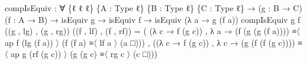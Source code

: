 \documentclass[
  11pt,
  oneside,
  article]{memoir}
\newenvironment{Shaded}{}{}
\newcommand{\NormalTok}[1]{#1}
\newcommand{\OtherTok}[1]{\textcolor[rgb]{0.00,0.44,0.13}{#1}}
\theoremstyle{definition}
\theoremstyle{plain}
\newcommand{\0}{\textsf{0}}
\newcommand{\1}{\tn{\textsf{1}}}
\begin{document}
\begin{Shaded}
\begin{Highlighting}[]
\NormalTok{compIsEquiv }\OtherTok{:} \OtherTok{∀} \OtherTok{\{}\NormalTok{ℓ ℓ\textquotesingle{} ℓ\textquotesingle{}\textquotesingle{}}\OtherTok{\}} \OtherTok{\{}\NormalTok{A }\OtherTok{:}\NormalTok{ Type ℓ}\OtherTok{\}} \OtherTok{\{}\NormalTok{B }\OtherTok{:}\NormalTok{ Type ℓ\textquotesingle{}}\OtherTok{\}} \OtherTok{\{}\NormalTok{C }\OtherTok{:}\NormalTok{ Type ℓ\textquotesingle{}\textquotesingle{}}\OtherTok{\}}
              \OtherTok{→} \OtherTok{(}\NormalTok{g }\OtherTok{:}\NormalTok{ B }\OtherTok{→}\NormalTok{ C}\OtherTok{)} \OtherTok{(}\NormalTok{f }\OtherTok{:}\NormalTok{ A }\OtherTok{→}\NormalTok{ B}\OtherTok{)} \OtherTok{→}\NormalTok{ isEquiv g }\OtherTok{→}\NormalTok{ isEquiv f}
              \OtherTok{→}\NormalTok{ isEquiv }\OtherTok{(λ}\NormalTok{ a }\OtherTok{→}\NormalTok{ g }\OtherTok{(}\NormalTok{f a}\OtherTok{))}
\NormalTok{compIsEquiv g f }\OtherTok{((}\NormalTok{g\textquotesingle{} , lg}\OtherTok{)}\NormalTok{ , }\OtherTok{(}\NormalTok{g\textquotesingle{}\textquotesingle{} , rg}\OtherTok{))} \OtherTok{((}\NormalTok{f\textquotesingle{} , lf}\OtherTok{)}\NormalTok{ , }\OtherTok{(}\NormalTok{f\textquotesingle{}\textquotesingle{} , rf}\OtherTok{))} \OtherTok{=} 
      \OtherTok{(} \OtherTok{(λ}\NormalTok{ c }\OtherTok{→}\NormalTok{ f\textquotesingle{} }\OtherTok{(}\NormalTok{g\textquotesingle{} c}\OtherTok{))}   
\NormalTok{      , }\OtherTok{λ}\NormalTok{ a }\OtherTok{→} \OtherTok{(}\NormalTok{f\textquotesingle{} }\OtherTok{(}\NormalTok{g\textquotesingle{} }\OtherTok{(}\NormalTok{g }\OtherTok{(}\NormalTok{f a}\OtherTok{))))}\NormalTok{   ≡〈 ap f\textquotesingle{} }\OtherTok{(}\NormalTok{lg }\OtherTok{(}\NormalTok{f a}\OtherTok{))}\NormalTok{ 〉 }
              \OtherTok{(}\NormalTok{f\textquotesingle{} }\OtherTok{(}\NormalTok{f a}\OtherTok{)}\NormalTok{             ≡〈 lf a 〉 }
              \OtherTok{(}\NormalTok{a                    □}\OtherTok{)))} 
\NormalTok{    , }\OtherTok{((λ}\NormalTok{ c }\OtherTok{→}\NormalTok{ f\textquotesingle{}\textquotesingle{} }\OtherTok{(}\NormalTok{g\textquotesingle{}\textquotesingle{} c}\OtherTok{))} 
\NormalTok{      , }\OtherTok{λ}\NormalTok{ c }\OtherTok{→} \OtherTok{(}\NormalTok{g }\OtherTok{(}\NormalTok{f }\OtherTok{(}\NormalTok{f\textquotesingle{}\textquotesingle{} }\OtherTok{(}\NormalTok{g\textquotesingle{}\textquotesingle{} c}\OtherTok{))))}\NormalTok{ ≡〈 ap g  }\OtherTok{(}\NormalTok{rf }\OtherTok{(}\NormalTok{g\textquotesingle{}\textquotesingle{} c}\OtherTok{))}\NormalTok{ 〉 }
              \OtherTok{(}\NormalTok{g }\OtherTok{(}\NormalTok{g\textquotesingle{}\textquotesingle{} c}\OtherTok{)}\NormalTok{            ≡〈 rg c 〉}
              \OtherTok{(}\NormalTok{c                    □}\OtherTok{)))}
\end{Highlighting}
\end{Shaded}
\end{document}

